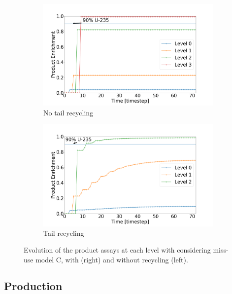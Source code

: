 \begin{figure}[h!]
    \centering
    \begin{subfigure}[t]{0.45\textwidth}
        \centering
        \includegraphics[scale=0.18]{NR_case3}
        \caption{No tail recycling}
        \label{sfig:case3_NR}
    \end{subfigure}%
    \begin{subfigure}[t]{0.45\textwidth}
        \centering
        \includegraphics[scale=0.18]{R_case3}
        \caption{Tail recycling}
        \label{sfig:case3_R}
    \end{subfigure}
    \caption{Evolution of the product assays at each level with considering
    miss-use model C, with (right) and without recycling (left).}
    \label{fig:case3}
\end{figure}



\subsection{Production}

